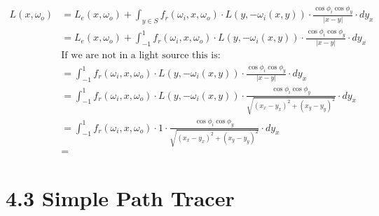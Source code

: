 \documentclass[a4paper]{scrartcl}
\begin{document}
\begin{align*}
  L(x, \omega_o) &= L_e(x, \omega_o) + \int_{y \in S} f_r(\omega_i, x, \omega_o) \cdot L(y, -\omega_i(x,y)) \cdot \frac{\cos \phi_i \cos \phi_y}{\lvert x - y \rvert} \cdot d y_x \\
  &= L_e(x, \omega_o) + \int_{-1}^{1} f_r(\omega_i, x, \omega_o) \cdot L(y, -\omega_i(x,y)) \cdot \frac{\cos \phi_i \cos \phi_y}{\lvert x - y \rvert} \cdot d y_x \\
  & \text{If we are not in a light source this is: } \\
  &= \int_{-1}^{1} f_r(\omega_i, x, \omega_o) \cdot L(y, -\omega_i(x,y)) \cdot \frac{\cos \phi_i \cos \phi_y}{\lvert x - y \rvert} \cdot d y_x \\
  &= \int_{-1}^{1} f_r(\omega_i, x, \omega_o) \cdot L(y, -\omega_i(x,y)) \cdot \frac{\cos \phi_i \cos \phi_y}{\sqrt{(x_x - y_x)^2 + (x_y - y_y)^2}} \cdot d y_x \\
  &= \int_{-1}^{1} f_r(\omega_i, x, \omega_o) \cdot 1 \cdot \frac{\cos \phi_i \cos \phi_y}{\sqrt{(x_x - y_x)^2 + (x_y - y_y)^2}} \cdot d y_x \\
  &= 
\end{align*}


\section*{4.3 Simple Path Tracer}
\end{document}
